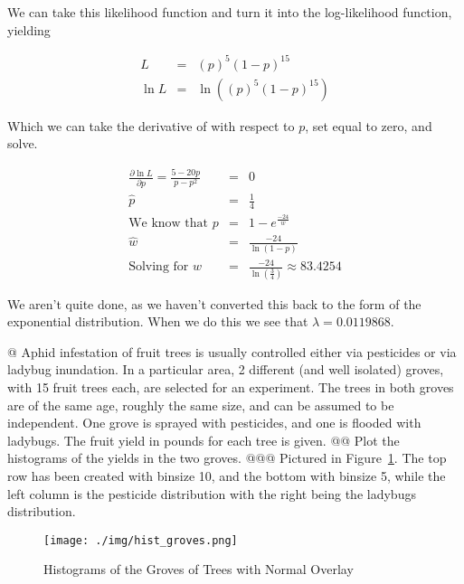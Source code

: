 \documentclass[10pt]{article}
\begin{document}
\begin{easylist}[enumerate]
    We can take this likelihood function and turn it into the log-likelihood function, yielding

    \[
        \begin{aligned}
            L &=& {\left( p \right)}^5 {\left( 1-p\right)}^{15}\\
            \ln L &=& \ln \left( {\left( p \right)}^5 {\left( 1-p\right)}^{15} \right)
        \end{aligned}
    \]

    Which we can take the derivative of with respect to $p$, set equal to zero, and solve.

    \[
        \begin{aligned}
            \frac{\partial \ln L}{\partial p} = \frac{5 - 20p}{p-p^2} &=& 0\\
            \hat{p} &=& \frac{1}{4}\\
            \text{We know that } p &=& 1 - e^\frac{-24}{w}\\
            \hat{w} &=& \frac{-24}{\ln(1-p)}\\
            \text{Solving for } \hat{w} &=& \frac{-24}{\ln \left( \frac{3}{4} \right)} \approx \boxed{83.4254}
        \end{aligned}
    \]

    We aren't quite done, as we haven't converted this back to the form of the exponential distribution. When we do
    this we see that $\lambda = 0.0119868$.

    @ Aphid infestation of fruit trees is usually controlled either via pesticides or via ladybug inundation. In a
    particular area, 2 different (and well isolated) groves, with 15 fruit trees each, are selected for an experiment.
    The trees in both groves are of the same age, roughly the same size, and can be assumed to be independent. One grove
    is sprayed with pesticides, and one is flooded with ladybugs. The fruit yield in pounds for each tree is given.
    @@ Plot the histograms of the yields in the two groves.
    @@@ Pictured in Figure~\ref{fig:hist_groves}. The top row has been created with binsize 10, and the bottom with
    binsize 5, while the left column is the pesticide distribution with the right being the ladybugs distribution.

        \begin{figure}[!ht]
            \centering
            \texttt{[image: ./img/hist\_groves.png]}
            \caption{Histograms of the Groves of Trees with Normal Overlay}
            \label{fig:hist_groves}
        \end{figure}


\end{easylist}
\end{document}
